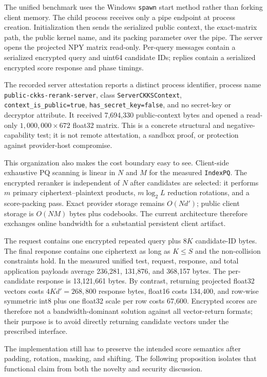 \documentclass[pdflatex,sn-basic,Numbered]{sn-jnl}
\theoremstyle{plain}
\begin{document}
The unified benchmark uses the Windows \texttt{spawn} start method rather than forking client memory. The child process receives only a pipe endpoint at process creation. Initialization then sends the serialized public context, the exact-matrix path, the public kernel name, and its packing parameter over the pipe. The server opens the projected NPY matrix read-only. Per-query messages contain a serialized encrypted query and uint64 candidate IDs; replies contain a serialized encrypted score response and phase timings.

The recorded server attestation reports a distinct process identifier, process name \texttt{public-ckks-rerank-server}, class \texttt{ServerCKKSContext}, \texttt{context\_is\_public=true}, \texttt{has\_secret\_key=false}, and no secret-key or decryptor attribute. It received 7,694,330 public-context bytes and opened a read-only $1{,}000{,}000\times672$ float32 matrix. This is a concrete structural and negative-capability test; it is not remote attestation, a sandbox proof, or protection against provider-host compromise.

This organization also makes the cost boundary easy to see. Client-side exhaustive PQ scanning is linear in $N$ and $M$ for the measured \texttt{IndexPQ}. The encrypted reranker is independent of $N$ after candidates are selected: it performs $m$ primary ciphertext--plaintext products, $m\log_2L$ reduction rotations, and a score-packing pass. Exact provider storage remains $O(Nd')$; public client storage is $O(NM)$ bytes plus codebooks. The current architecture therefore exchanges online bandwidth for a substantial persistent client artifact.

The request contains one encrypted repeated query plus $8K$ candidate-ID bytes. The final response contains one ciphertext as long as $K\leq S$ and the non-collision constraints hold. In the measured unified test, request, response, and total application payloads average 236,281, 131,876, and 368,157 bytes. The per-candidate response is 13,121,661 bytes. By contrast, returning projected float32 vectors costs $4Kd'=268{,}800$ response bytes, float16 costs 134,400, and row-wise symmetric int8 plus one float32 scale per row costs 67,600. Encrypted scores are therefore not a bandwidth-dominant solution against all vector-return formats; their purpose is to avoid directly returning candidate vectors under the prescribed interface.

The implementation still has to preserve the intended score semantics after padding, rotation, masking, and shifting. The following proposition isolates that functional claim from both the novelty and security discussion.
\end{document}
